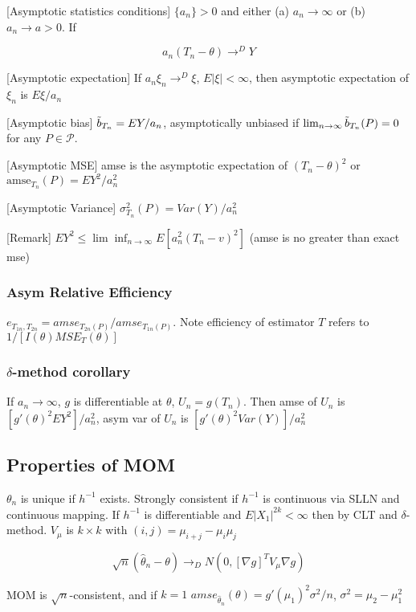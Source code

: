 [Asymptotic statistics conditions] $\{a_n\}>0$ and either (a) $a_n\rightarrow\infty$ or (b) $a_n \rightarrow a > 0$. If

$$a_n(T_n-\theta)\rightarrow^D Y$$

[Asymptotic expectation]
If $a_n\xi_n\rightarrow^D \xi$, $E|\xi| < \infty$, then asymptotic expectation of $\xi_n$ is ${E\xi}/{a_n}$

[Asymptotic bias] $\Tilde{b}_{T_n} = EY/a_n$,
asymptotically unbiased if $\lim_{n\rightarrow\infty} \Tilde{b}_{T_n}(P) = 0$ for any $P \in \mathcal{P}$.

[Asymptotic MSE] amse is the asymptotic expectation of $(T_n-\theta)^2$ or $\text{amse}_{T_n}(P)=EY^2/a_n^2$

[Asymptotic Variance] $\sigma_{T_n}^2(P) = Var(Y)/a_n^2$

[Remark] $EY^2\leq \lim\inf_{n\rightarrow\infty} E[a_n^2(T_n-v)^2]$ (amse is no greater than exact mse)

\subsubsection{Asym Relative Efficiency}

$e_{T_{1n}, T_{2n}} = amse_{T_{2n}(P)} / amse_{T_{1n}(P)}$.
Note efficiency of estimator $T$ refers to $1/[I(\theta)MSE_T(\theta)]$

\subsubsection{$\delta$-method corollary}

If $a_n\rightarrow\infty$, $g$ is differentiable at $\theta$, $U_n = g(T_n)$.
Then amse of $U_n$ is $[g'(\theta)^2EY^2]/a_n^2$, asym var of $U_n$ is $[g'(\theta)^2Var(Y)]/a_n^2$

\subsection{Properties of MOM}

$\theta_n$ is unique if $h^{-1}$ exists. Strongly consistent if $h^{-1}$ is continuous via SLLN and continuous mapping. If $h^{-1}$ is differentiable and $E|X_1|^{2k}<\infty$ then by CLT and $\delta$-method. $V_\mu$ is $k\times k$ with $(i, j) = \mu_{i+j}-\mu_i\mu_j$

$$
\sqrt{n} (\hat\theta_n-\theta) \rightarrow_D N(0, [\nabla g]^T V_\mu \nabla g)
$$

MOM is $\sqrt{n}$-consistent, and if $k=1$ $amse_{\hat\theta_n}(\theta)=g'(\mu_1)^2\sigma^2/n$, $\sigma^2=\mu_2-\mu_1^2$

